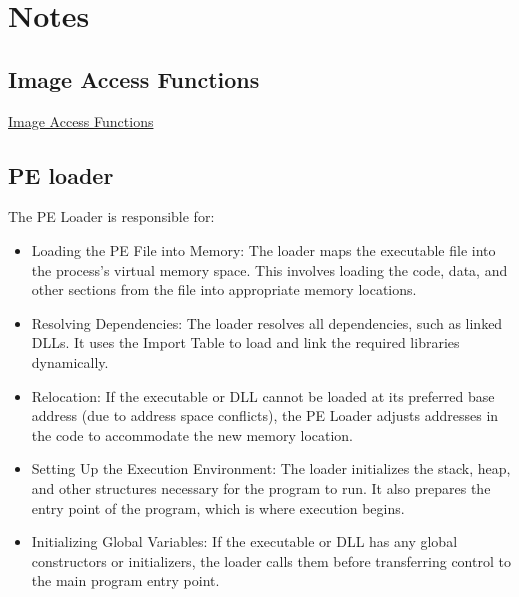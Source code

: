 \section{Notes}

\subsection{Image Access Functions}

\href{https://learn.microsoft.com/en-us/windows/win32/debug/image-access-functions}{Image Access Functions}

\subsection{PE loader}

The PE Loader is responsible for:
\begin{itemize}
    \item Loading the PE File into Memory: The loader maps the executable file into the process's virtual memory space. This involves loading the code, data, and other sections from the file into appropriate memory locations.
    \item Resolving Dependencies: The loader resolves all dependencies, such as linked DLLs. It uses the Import Table to load and link the required libraries dynamically.
    \item Relocation: If the executable or DLL cannot be loaded at its preferred base address (due to address space conflicts), the PE Loader adjusts addresses in the code to accommodate the new memory location.
    \item Setting Up the Execution Environment: The loader initializes the stack, heap, and other structures necessary for the program to run. It also prepares the entry point of the program, which is where execution begins.
    \item Initializing Global Variables: If the executable or DLL has any global constructors or initializers, the loader calls them before transferring control to the main program entry point.
\end{itemize}

